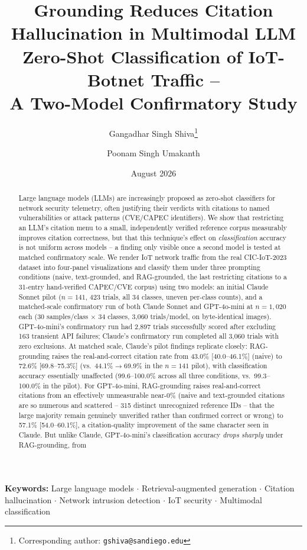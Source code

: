 \documentclass[10pt,twocolumn]{article}
\title{Grounding Reduces Citation Hallucination in Multimodal LLM\\
Zero-Shot Classification of IoT-Botnet Traffic --\\
\large A Two-Model Confirmatory Study}
\author[1]{Gangadhar Singh Shiva\thanks{Corresponding author: \texttt{gshiva@sandiego.edu}}}
\author[2]{Poonam Singh Umakanth}
\affil[1]{University of San Diego, San Diego, CA, USA}
\affil[2]{HPE Juniper Networking, Hewlett Packard Enterprise}
\date{August 2026}
\begin{document}
\maketitle

\noindent\textbf{Keywords:} Large language models $\cdot$ Retrieval-augmented generation $\cdot$
Citation hallucination $\cdot$ Network intrusion detection $\cdot$ IoT security $\cdot$
Multimodal classification

\begin{abstract}
Large language models (LLMs) are increasingly proposed as zero-shot classifiers for network
security telemetry, often justifying their verdicts with citations to named vulnerabilities or
attack patterns (CVE/CAPEC identifiers). We show that restricting an LLM's citation menu to a
small, independently verified reference corpus measurably improves citation correctness, but
that this technique's effect on \emph{classification} accuracy is not uniform across models --
a finding only visible once a second model is tested at matched confirmatory scale. We render IoT
network traffic from the real CIC-IoT-2023 dataset into four-panel visualizations and classify
them under three prompting conditions (naive, text-grounded, and RAG-grounded, the last
restricting citations to a 31-entry hand-verified CAPEC/CVE corpus) using two models: an initial
Claude Sonnet pilot ($n=141$, 423 trials, all 34 classes, uneven per-class counts), and a
matched-scale confirmatory run of both Claude Sonnet and GPT-4o-mini at $n=1{,}020$ each
(30 samples/class $\times$ 34 classes, 3,060 trials/model, on byte-identical images). GPT-4o-mini's
confirmatory run had 2,897 trials successfully scored after excluding 163 transient API failures;
Claude's confirmatory run completed all 3,060 trials with zero exclusions. At matched scale,
Claude's pilot findings replicate closely: RAG-grounding raises the real-and-correct citation rate
from 43.0\% [40.0--46.1\%] (naive) to 72.6\% [69.8--75.3\%] (vs.\ 44.1\%$\to$69.9\% in the
$n=141$ pilot), with classification accuracy essentially unaffected (99.6--100.0\% across all
three conditions, vs.\ 99.3--100.0\% in the pilot). For GPT-4o-mini, RAG-grounding raises
real-and-correct citations from an effectively unmeasurable near-0\% (naive and text-grounded
citations are so numerous and scattered -- 315 distinct unrecognized reference IDs -- that the
large majority remain genuinely unverified rather than confirmed correct or wrong) to 57.1\%
[54.0--60.1\%], a citation-quality improvement of the same character seen in Claude. But unlike
Claude, GPT-4o-mini's classification accuracy \emph{drops sharply} under RAG-grounding, from

\end{abstract}
\end{document}
